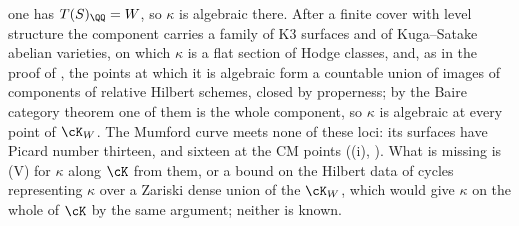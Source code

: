 \begin{remark}
one has $T(S)_{\QQ}=W$, so $\kappa$ is algebraic there. After a finite cover
with level structure the component carries a family of K3 surfaces and of
Kuga--Satake abelian varieties, on which $\kappa$ is a flat section of Hodge
classes, and, as in the proof of , the points at which it
is algebraic form a countable union of images of components of relative
Hilbert schemes, closed by properness; by the Baire category theorem one of
them is the whole component, so $\kappa$ is algebraic at every point of
$\cK_{W}$. The Mumford curve meets none of these loci: its surfaces have
Picard number thirteen, and sixteen at the CM points
((i), ). What is missing is
\textup{(V)} for $\kappa$ along $\cK$ from them, or a bound on the Hilbert data
of cycles representing $\kappa$ over a Zariski dense union of the $\cK_{W}$,
which would give $\kappa$ on the whole of $\cK$ by the same argument; neither
is known.
\end{remark}

